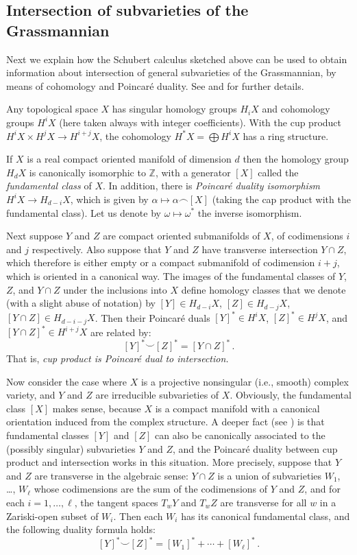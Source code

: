 \documentclass[10pt, a4paper]{amsart}
\theoremstyle{plain}
\theoremstyle{definition}
\theoremstyle{remark}
\theoremstyle{note}
\numberwithin{equation}{section}
\begin{document}
\subsection{Intersection of subvarieties of the Grassmannian}\label{ss.intersection}

Next we explain how the Schubert calculus sketched above can be used to obtain information
about intersection of general subvarieties of the Grassmannian,
by means of cohomology and Poincar\'{e} duality.
See \cite[Appendix~B]{Fulton} and \cite{Hutchings} for further details.

\medskip

Any topological space $X$ has singular homology groups $H_i X$ and cohomology groups $H^i X$ (here taken always with integer coefficients). With the cup product $H^i X \times H^j X \to H^{i+j} X$,
the cohomology $H^* X = \bigoplus H^i X$ has a ring structure.

If $X$ is a real compact oriented manifold of dimension $d$ then 
the homology group $H_d X$ is canonically isomorphic to ${\mathbb{Z}}$, with a generator $[X]$
called the \emph{fundamental class} of $X.$
In addition, there is \emph{Poincar\'{e} duality isomorphism}
$H^i X \to H_{d-i} X$, which is given by 
$\alpha \mapsto \alpha \smallfrown [X]$
(taking the cap product with the fundamental class).
Let us denote by $\omega \mapsto \omega^*$ the inverse isomorphism.

Next suppose $Y$ and $Z$ are compact oriented submanifolds of $X$, of codimensions $i$ and $j$ respectively.
Also suppose that $Y$ and $Z$ have transverse intersection
$Y \cap Z$, which therefore is either empty or a compact submanifold of codimension $i + j$,
which is oriented in a canonical way.
The images of the fundamental classes of $Y$, $Z$, and $Y\cap Z$ under the inclusions into $X$
define homology classes that we denote (with a slight abuse of notation) by
$[Y] \in H_{d-i} X$, $[Z] \in H_{d-j} X$, $[Y\cap Z] \in H_{d-i-j} X$.
Then their Poincar\'e duals 
$[Y]^*\in H^i X$, $[Z]^* \in H^j X$, and $[Y \cap Z]^* \in H^{i+j} X$
are related by: 
$$
[Y]^* {\smallsmile} [Z]^* = [Y \cap Z]^* \, .
$$
That is, \emph{cup product is Poincar\'{e} dual to intersection.}

Now consider the case where $X$ is a projective nonsingular (i.e., smooth) complex variety,
and $Y$ and $Z$ are irreducible  subvarieties of $X$.
Obviously, the fundamental class $[X]$ makes sense, because $X$ is a compact manifold
with a canonical orientation induced from the complex structure.
A deeper fact (see \cite[Appendix~B]{Fulton})
is that fundamental classes $[Y]$ and $[Z]$ can also be canonically associated to 
the (possibly singular) subvarieties $Y$ and $Z$,
and the Poincar\'{e} duality between cup product and intersection 
works in this situation.
More precisely,
suppose that $Y$ and $Z$ are transverse in the algebraic sense:
$Y \cap Z$ is a union of subvarieties $W_1$, \dots, $W_\ell$
whose codimensions are the sum of the codimensions of $Y$ and $Z$,
and for each $i=1,\dots,\ell$, the tangent spaces
$T_w Y$ and $T_w Z$ are transverse 
for all $w$ in a Zariski-open subset of $W_i$.
Then each $W_i$ has its canonical fundamental class, 
and the following duality formula holds:
$$
[Y]^* {\smallsmile} [Z]^* = [W_1]^* + \cdots + [W_\ell]^* \, .
$$
\end{document}
